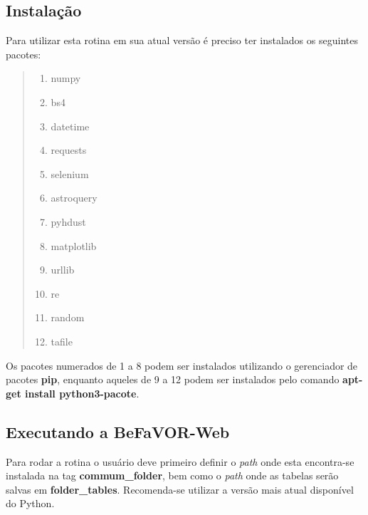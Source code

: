 \documentclass[letterpaper,10pt,english]{sphinxmanual}
\begin{document}
\subsection{Instalação}
\label{index:instalacao}
Para utilizar esta rotina em sua atual versão é preciso ter instalados os seguintes pacotes:
\begin{quote}
\begin{enumerate}
\item {} 
numpy

\item {} 
bs4

\item {} 
datetime

\item {} 
requests

\item {} 
selenium

\item {} 
astroquery

\item {} 
pyhdust

\item {} 
matplotlib

\end{enumerate}
\begin{enumerate}
\setcounter{enumi}{8}
\item {} 
urllib

\item {} 
re

\item {} 
random

\item {} 
tafile

\end{enumerate}
\end{quote}

Os pacotes numerados de 1 a 8 podem ser instalados utilizando o gerenciador de pacotes \textbf{pip}, enquanto aqueles de 9 a 12 podem ser instalados pelo comando \textbf{apt-get install python3-pacote}.


\subsection{Executando a BeFaVOR-Web}
\label{index:executando-a-befavor-web}
Para rodar a rotina o usuário deve primeiro definir o \emph{path} onde esta encontra-se instalada na tag \textbf{commum\_folder}, bem como o \emph{path} onde as tabelas serão salvas em \textbf{folder\_tables}. Recomenda-se utilizar a versão mais atual disponível do Python.
\end{document}
